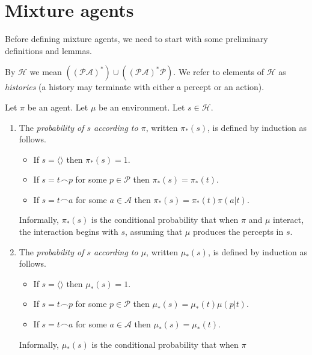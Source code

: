 \documentclass[runningheads]{llncs}
\begin{document}
\section{Mixture agents}

Before defining mixture agents, we need to start with some preliminary definitions
and lemmas.

\begin{definition}
    By $\mathcal H$ we mean
    $((\mathcal P\mathcal A)^*)\cup((\mathcal P\mathcal A)^*\mathcal P)$.
    We refer to elements of $\mathcal H$ as \emph{histories} (a history
    may terminate with either a percept or an action).
\end{definition}

\begin{definition}
\label{pullbackdef}
    Let $\pi$ be an agent. Let $\mu$ be an environment. Let $s\in\mathcal H$.
    \begin{enumerate}
        \item
        The \emph{probability of $s$ according to $\pi$}, written
        $\pi_*(s)$, is defined by induction as follows.
        \begin{itemize}
            \item
            If $s=\langle\rangle$ then $\pi_*(s)=1$.
            \item
            If $s=t\frown p$ for some $p\in\mathcal P$ then $\pi_*(s)=\pi_*(t)$.
            \item
            If $s=t\frown a$ for some $a\in\mathcal A$ then $\pi_*(s)=\pi_*(t)\pi(a|t)$.
        \end{itemize}
        Informally, $\pi_*(s)$ is the conditional probability that when $\pi$
        and $\mu$ interact, the interaction begins with $s$, assuming
        that $\mu$ produces the percepts in $s$.
        \item
        The \emph{probability of $s$ according to $\mu$}, written
        $\mu_*(s)$, is defined by induction as follows.
        \begin{itemize}
            \item
            If $s=\langle\rangle$ then $\mu_*(s)=1$.
            \item
            If $s=t\frown p$ for some $p\in\mathcal P$ then $\mu_*(s)=\mu_*(t)\mu(p|t)$.
            \item
            If $s=t\frown a$ for some $a\in\mathcal A$ then $\mu_*(s)=\mu_*(t)$.
        \end{itemize}
        Informally, $\mu_*(s)$ is the conditional probability that when $\pi$

\end{enumerate}
\end{definition}
\end{document}
